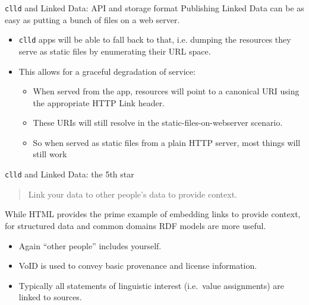 \documentclass{beamer}
\begin{document}
\begin{frame}{\texttt{clld} and Linked Data: API and storage format}
Publishing Linked Data can be as easy as putting a bunch of files on a web server.
\begin{itemize}
\item \texttt{clld} apps will be able to fall back to that, i.e.
dumping the resources they serve as static files
by enumerating their URL space.
\item This allows for a graceful degradation of service:
\begin{itemize}
\item When served from the app, resources will point to a canonical URI using the appropriate HTTP Link header.
\item These URIs will still resolve in the static-files-on-webserver scenario.
\item So when served as static files from a plain HTTP server, most things will
still work
\end{itemize}
\end{itemize}
\end{frame}


\begin{frame}{\texttt{clld} and Linked Data: the 5th star}
\begin{quote}
Link your data to other people’s data to provide context.
\end{quote}
While HTML provides the prime example of embedding links to provide context,
for structured data and common domains RDF models are more useful.
\begin{itemize}
\item Again ``other people'' includes yourself.
\item VoID is used to convey basic provenance and license information.
\item Typically all statements of linguistic interest (i.e.~value assignments)
are linked to sources.
\end{itemize}
\end{frame}
\end{document}

